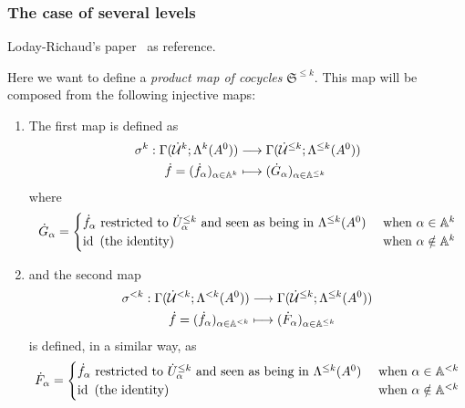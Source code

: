 \subsubsection{The case of several levels}
Loday-Richaud's paper~\cite{Loday1994} as reference.
\begin{defn}\label{defn:firstSetOfInlusions}
  Here we want to define a \emph{product map of cocycles}
  $\mathfrak{S}^{\leq k}$.
  This map will be composed from the following injective maps:
  \begin{enumerate}
    \item The first map is defined as
      \begin{align*}
        \sigma^k:\Gamma(\dot{\mathcal{U}}^k;\Lambda^k(A^0))
        &\longrightarrow \Gamma(\dot{\mathcal{U}}^{\leq k};\Lambda^{\leq k}(A^0))
      \\\dot f=(\dot f_\alpha)_{\alpha\in\mathbb{A}^k}
        &\longmapsto (\dot G_\alpha)_{\alpha\in\mathbb{A}^{\leq k}}
      \end{align*}
      where
      \[
        \dot G_\alpha=\begin{cases}
          \dot f_\alpha \text{~restricted to } \dot U_\alpha^{\leq k}
          \text{~and seen as being in } \Lambda^{\leq k}(A^0)
          & \text{~when } \alpha\in\mathbb{A}^k
        \\\operatorname{id} \text{~(the identity) }
          & \text{~when } \alpha\notin\mathbb{A}^k
        \end{cases}
      \]
    \item and the second map
      \begin{align*}
        \sigma^{<k}:\Gamma(\dot{\mathcal{U}}^{<k};\Lambda^{<k}(A^0))
        &\longrightarrow \Gamma(\dot{\mathcal{U}}^{\leq k};\Lambda^{\leq k}(A^0))
      \\\dot f=(\dot f_\alpha)_{\alpha\in\mathbb{A}^{<k}}
        &\longmapsto (\dot F_\alpha)_{\alpha\in\mathbb{A}^{\leq k}}
      \end{align*}
      is defined, in a similar way, as
      \[
        \dot F_\alpha=\begin{cases}
          \dot f_\alpha \text{~restricted to } \dot U_\alpha^{\leq k}
          \text{~and seen as being in } \Lambda^{\leq k}(A^0)
          & \text{~when } \alpha\in\mathbb{A}^{<k}
        \\\operatorname{id} \text{~(the identity) }
          & \text{~when } \alpha\notin\mathbb{A}^{<k}
        \end{cases}
      \]
  \end{enumerate}

\end{defn}

